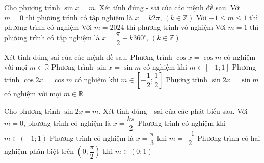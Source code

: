\begin{ex}%
 Cho phương trình $\sin  x=m$. Xét tính đúng - sai của các mệnh đề sau.
 \choiceTF 
  { Với $m=0$ thì phương trình có tập nghiệm là $x=k 2 \pi$, $(k \in \mathbb{Z})$} 
  {\True Với $-1 \leq m  \leq 1$ thì phương trình có nghiệm}
  {\True Với $m=2024$  thì phương trình vô nghiệm}
  { Với $m=1$ thì phương  trình có tập nghiệm là $x=\dfrac{\pi}{2}+k 360^{\circ}$, $(k \in \mathbb{Z})$}
\end{ex}

\begin{ex}%
 Xét tính đúng sai của  các mệnh đề sau.
  \choiceTF
  {\True Phương trình  $\cos x=\cos m$ có nghiệm với mọi $m\in\mathbb{R}$}
  {Phương  trình $\sin x=\sin m$ có nghiệm khi $m\in [-1;1]$}
  {Phương trình $\cos 2x=\cos  m$ có nghiệm khi $m\in\left[-\dfrac{1}{2};\dfrac{1}{2}\right]$}
  {\True Phương trình $\sin 2x=\sin  m$ có nghiệm với mọi $m\in\mathbb{R}$}
\end{ex}

\begin{ex}%
 Cho phương trình $\sin 2 x=m$. Xét tính đúng - sai của các phát  biểu sau.
  \choiceTF
  {\True Với $m=0$, phương trình có nghiệm là $x=\dfrac{k \pi}{2}$} 
  {Phương trình có nghiệm khi $m \in(-1; 1)$} 
  { Phương trình  có nghiệm là $x=\dfrac{\pi}{3}$ khi $m=\dfrac{-1}{2}$}
  {\True Phương trình có hai nghiệm phân biệt trên $\left(0; \dfrac{\pi}{2}\right)$ khi  $m \in(0; 1)$}
\end{ex}


